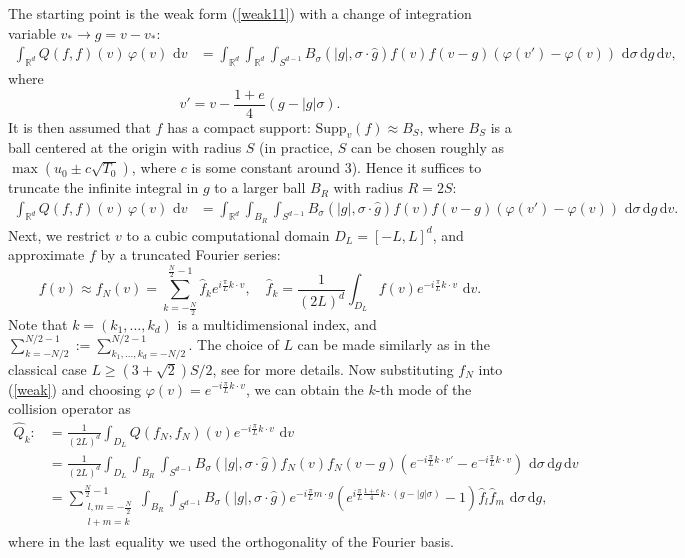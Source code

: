 \documentclass[review,times]{elsarticle}
\newcommand{\rd}{\,\mathrm{d}}
\begin{document}
The starting point is the weak form (\ref{weak11}) with a change of integration variable $v_* \rightarrow g=v-v_*$:
\begin{align} 
\int_{\mathbb{R}^d} Q(f,f)(v)\,\varphi(v)\,\rd{v}&= \int_{\mathbb{R}^d} \int_{\mathbb{R}^d} \int_{S^{d-1}} B_{\sigma}(|g|,\sigma\cdot \hat{g})f(v)f(v-g)  \left(\varphi(v')-\varphi(v)\right)\,\rd{\sigma} \rd{g} \rd{v},
\end{align}
where
\begin{equation}
v'=v-\frac{1+e}{4}(g-|g|\sigma).
\end{equation}
It is then assumed that $f$ has a compact support: $\text{Supp}_v(f) \approx B_S$, where $B_S$ is a ball centered at the origin with radius $S$ (in practice, $S$ can be chosen roughly as  $\max(u_0\pm c\sqrt{T_0})$, where $c$ is some constant around 3). Hence it suffices to truncate the infinite integral in $g$ to a larger ball $B_R$ with radius $R=2S$:
\begin{align}  \label{weak}
\int_{\mathbb{R}^d} Q(f,f)(v)\,\varphi(v)\,\rd{v}&= \int_{\mathbb{R}^d} \int_{B_R} \int_{S^{d-1}} B_{\sigma}(|g|,\sigma\cdot \hat{g})f(v)f(v-g)  \left(\varphi(v')-\varphi(v)\right)\,\rd{\sigma} \rd{g} \rd{v}.
\end{align}
Next, we restrict $v$ to a cubic computational domain $D_L=[-L,L]^d$, and approximate $f$ by a truncated Fourier series:
\begin{equation}
f(v)\approx f_N(v)=\sum_{k=-\frac{N}{2}}^{\frac{N}{2}-1}\hat{f}_k e^{i\frac{\pi}{L}k\cdot v}, \quad \hat{f}_k=\frac{1}{(2L)^d}\int_{D_L}f(v)e^{-i\frac{\pi}{L}k\cdot v}\,\rd{v}.
\end{equation}
Note that $k=(k_1,\dots,k_d)$ is a multidimensional index, and $\sum_{k=-N/2}^{N/2-1}:=\sum_{k_1,\dots,k_d=-N/2}^{N/2-1}$. The choice of $L$ can be made similarly as in the classical case $L\geq (3+\sqrt{2})S/2$, see \cite{PR00, FPT05} for more details. Now substituting $f_N$ into (\ref{weak}) and choosing $\varphi(v)=e^{-i\frac{\pi}{L}k\cdot v}$, we can obtain the $k$-th mode of the collision operator as
\begin{align} \label{QQ}
\hat{Q}_k:&=\frac{1}{(2L)^d}\int_{D_L}Q(f_N,f_N)(v)e^{-i\frac{\pi}{L}k\cdot v}\,\rd{v}\nonumber\\
&=\frac{1}{(2L)^d}\int_{D_L} \int_{B_R} \int_{S^{d-1}} B_{\sigma}(|g|,\sigma\cdot \hat{g})f_N(v)f_N(v-g)  \left(e^{-i\frac{\pi}{L}k\cdot v'}-e^{-i\frac{\pi}{L}k\cdot v}\right)\,\rd{\sigma} \rd{g} \rd{v}\nonumber\\
&=\sum_{\substack{l,m=-\frac{N}{2}\\l+m=k}}^{\frac{N}{2}-1}\int_{B_R}\int_{S^{d-1}}B_{\sigma}(|g|,\sigma\cdot \hat{g})e^{-i\frac{\pi}{L}m\cdot g}\left(e^{i\frac{\pi}{L}\frac{1+e}{4}k\cdot (g-|g|\sigma)}-1\right)\hat{f}_l\hat{f}_m\,\rd{\sigma} \rd{g},
\end{align}
where in the last equality we used the orthogonality of the Fourier basis.
\end{document}
